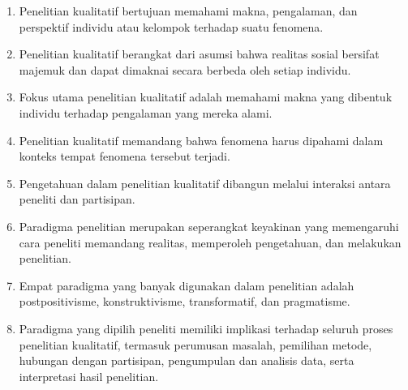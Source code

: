 \documentclass[
  indonesian,
  letterpaper,
  DIV=11,
  numbers=noendperiod]{scrreprt}
\providecommand{\tightlist}{%
  \setlength{\itemsep}{0pt}\setlength{\parskip}{0pt}}
\begin{document}
\begin{tcolorbox}[enhanced jigsaw, colframe=quarto-callout-tip-color-frame, toptitle=1mm, breakable, leftrule=.75mm, arc=.35mm, toprule=.15mm, colback=white, colbacktitle=quarto-callout-tip-color!10!white, bottomtitle=1mm, bottomrule=.15mm, titlerule=0mm, title=\textcolor{quarto-callout-tip-color}{\faLightbulb}\hspace{0.5em}{Rangkuman}, coltitle=black, left=2mm, opacitybacktitle=0.6, opacityback=0, rightrule=.15mm]

\begin{enumerate}
\def\labelenumi{\arabic{enumi}.}
\tightlist
\item
  Penelitian kualitatif bertujuan memahami makna, pengalaman, dan
  perspektif individu atau kelompok terhadap suatu fenomena.
\item
  Penelitian kualitatif berangkat dari asumsi bahwa realitas sosial
  bersifat majemuk dan dapat dimaknai secara berbeda oleh setiap
  individu.
\item
  Fokus utama penelitian kualitatif adalah memahami makna yang dibentuk
  individu terhadap pengalaman yang mereka alami.
\item
  Penelitian kualitatif memandang bahwa fenomena harus dipahami dalam
  konteks tempat fenomena tersebut terjadi.
\item
  Pengetahuan dalam penelitian kualitatif dibangun melalui interaksi
  antara peneliti dan partisipan.
\item
  Paradigma penelitian merupakan seperangkat keyakinan yang memengaruhi
  cara peneliti memandang realitas, memperoleh pengetahuan, dan
  melakukan penelitian.
\item
  Empat paradigma yang banyak digunakan dalam penelitian adalah
  postpositivisme, konstruktivisme, transformatif, dan pragmatisme.
\item
  Paradigma yang dipilih peneliti memiliki implikasi terhadap seluruh
  proses penelitian kualitatif, termasuk perumusan masalah, pemilihan
  metode, hubungan dengan partisipan, pengumpulan dan analisis data,
  serta interpretasi hasil penelitian.
\end{enumerate}

\end{tcolorbox}
\end{document}
